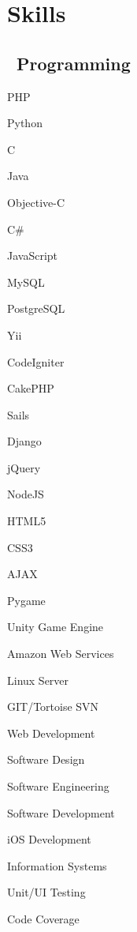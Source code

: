 \section*{Skills}

\subsection*{{\color{special-color}\faCode \  Programming}}

\speciallinebreak
\begin{description}
	\begin{multicols}{5}

		\item PHP
		\item Python
		\item C
		\item Java
		\item Objective-C
		\item C\#
		\item JavaScript
		\item MySQL
		\item PostgreSQL

		\item Yii
		\item CodeIgniter
		\item CakePHP
		\item Sails
		\item Django

		\item jQuery
		\item NodeJS
		\item HTML5
		\item CSS3
		\item AJAX
		\item Pygame

	\end{multicols}
\end{description}

\speciallinebreak

\begin{description}
	\begin{multicols}{4}

		\item Unity Game Engine
		\item Amazon Web Services
		\item Linux Server
		\item GIT/Tortoise SVN

		\item Web Development
		\item Software Design
		\item Software Engineering
		\item Software Development

		\item iOS Development
		\item Information Systems
		\item Unit/UI Testing
		\item Code Coverage

	\end{multicols}
\end{description}

